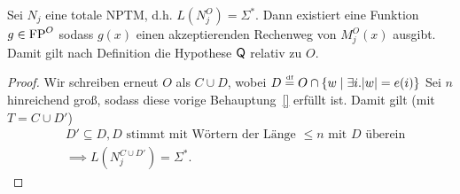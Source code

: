 \begin{claim}
    Sei $N_j$ eine totale NPTM, d.h. $L(N_j^O)=\Sigma^*$. Dann existiert eine Funktion $g\in \mathrm{FP}^O$ sodass $g(x)$ einen akzeptierenden Rechenweg von $M^O_j(x)$ ausgibt. Damit gilt nach Definition die Hypothese $\mathsf{Q}$ relativ zu $O$.
\end{claim}
\begin{proof}
    Wir schreiben erneut $O$ als $C\cup D$, wobei $D\stackrel{\text{\smash{\tiny df}}}{=} O \cap \{ w \mid \exists i.|w|=e(i)\}$
    Sei $n$ hinreichend groß, sodass diese vorige Behauptung~\ref{} erfüllt ist.
    Damit gilt (mit $T=C\cup D'$) 
    \begin{equation} \begin{split}&D'\subseteq D, \text{$D$ stimmt mit Wörtern der Länge $\leq n$ mit $D$ überein} \\ &\implies L(N_j^{C\cup D'})=\Sigma^*.\end{split}\label{eq:oracle-1a} \end{equation}



\end{proof}
